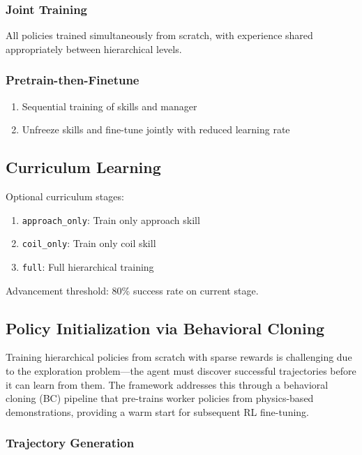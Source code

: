\documentclass[11pt]{article}
\begin{document}
\subsubsection{Joint Training}

All policies trained simultaneously from scratch, with experience shared appropriately between hierarchical levels.

\subsubsection{Pretrain-then-Finetune}
\begin{enumerate}
    \item Sequential training of skills and manager
    \item Unfreeze skills and fine-tune jointly with reduced learning rate
\end{enumerate}

\subsection{Curriculum Learning}

Optional curriculum stages:
\begin{enumerate}
    \item \texttt{approach\_only}: Train only approach skill
    \item \texttt{coil\_only}: Train only coil skill
    \item \texttt{full}: Full hierarchical training
\end{enumerate}

Advancement threshold: 80\% success rate on current stage.

\subsection{Policy Initialization via Behavioral Cloning}

Training hierarchical policies from scratch with sparse rewards is challenging due to the exploration problem---the agent must discover successful trajectories before it can learn from them. The framework addresses this through a behavioral cloning (BC) pipeline that pre-trains worker policies from physics-based demonstrations, providing a warm start for subsequent RL fine-tuning.

\subsubsection{Trajectory Generation}
\end{document}
